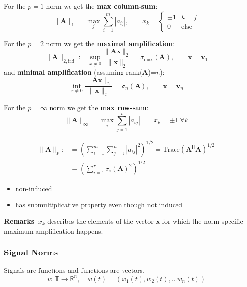 For the $p = 1$ norm we get the \textbf{max column-sum}:
\begin{equation*}
    \|\mathbf{A}\|_1=\max_j\sum_{i=1}^m|a_{ij}|,\qquad x_k=\begin{cases}
        \pm 1 & k=j         \\
        0     & \text{else}
    \end{cases}
\end{equation*}

\newpar{}
For the $p = 2$ norm we get the \textbf{maximal amplification}:
\noindent\begin{equation*}
    \|\mathbf{A}\|_{2,\mathrm{ind}}:=\sup_{x\neq0}\frac{\|\mathbf{Ax}\|_2}{\|\mathbf{x}\|_2}=\sigma_{\max}(\mathbf{A}),\qquad \mathbf{x}=\mathbf{v}_1
\end{equation*}
and \textbf{minimal amplification} (assuming rank($\mathbf{A}$)=$n$):
\noindent\begin{equation*}
    \inf_{x\neq0}\frac{\|\mathbf{Ax}\|_2}{\|\mathbf{x}\|_2}=\sigma_n(\mathbf{A}),\qquad \mathbf{x}=\mathbf{v}_n
\end{equation*}

\newpar{}
For the $p = \infty$ norm we get the \textbf{max row-sum}:
\begin{equation*}
    \|\mathbf{A}\|_\infty=\max_i\sum_{j=1}^n|a_{ij}|\qquad x_k=\pm 1\;\forall k
\end{equation*}


\noindent\begin{align*}
    \|\mathbf{A}\|_F: & ={\left(\sum_{i=1}^m\sum_{j=1}^n|a_{ij}|^2\right)}^{1/2}=\text{Trace}{(\mathbf{A}^{\mathsf{H}}\mathbf{A})}^{1/2} \\
                      & = {\left(\sum_{i=1}^r\sigma_i{(\mathbf{A})}^2\right)}^{1/2}
\end{align*}

\begin{itemize}
    \item non-induced
    \item has submultiplicative property even though not induced
\end{itemize}

\textbf{Remarks}: $x_k$ describes the elements of the vector $\mathbf{x}$ for which the norm-specific maximum amplification happens.

\subsubsection{Signal Norms}
Signals are functions and functions are vectors.
\noindent\begin{equation*}
    w:\mathbb{T}\rightarrow \mathbb{R}^n, \quad w(t)=(w_1(t), w_2(t), \ldots w_n(t))
\end{equation*}

